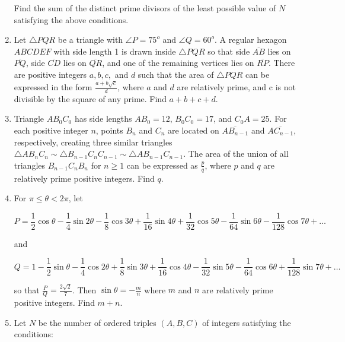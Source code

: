 \documentclass{article}
\begin{document}
\begin{enumerate}[label=\arabic*., itemsep=0.5em]
Find the sum of the distinct prime divisors of the least possible value of $N$ satisfying the above conditions.\par \vspace{0.5em}\item Let $\bigtriangleup PQR$ be a triangle with $\angle P = 75^o$ and $\angle Q = 60^o$. A regular hexagon $ABCDEF$ with side length 1 is drawn inside $\triangle PQR$ so that side $\overline{AB}$ lies on $\overline{PQ}$, side $\overline{CD}$ lies on $\overline{QR}$, and one of the remaining vertices lies on $\overline{RP}$. There are positive integers $a, b, c, $ and $d$ such that the area of $\triangle PQR$ can be expressed in the form $\frac{a+b\sqrt{c}}{d}$, where $a$ and $d$ are relatively prime, and c is not divisible by the square of any prime. Find $a+b+c+d$.\par \vspace{0.5em}\item Triangle $AB_0C_0$ has side lengths $AB_0 = 12$, $B_0C_0 = 17$, and $C_0A = 25$. For each positive integer $n$, points $B_n$ and $C_n$ are located on $\overline{AB_{n-1}}$ and $\overline{AC_{n-1}}$, respectively, creating three similar triangles $\triangle AB_nC_n \sim \triangle B_{n-1}C_nC_{n-1} \sim \triangle AB_{n-1}C_{n-1}$. The area of the union of all triangles $B_{n-1}C_nB_n$ for $n\geq1$ can be expressed as $\tfrac pq$, where $p$ and $q$ are relatively prime positive integers. Find $q$.\par \vspace{0.5em}\item For $\pi \le \theta < 2\pi$, let


\begin{equation*}
P=\dfrac12\cos\theta-\dfrac14\sin2\theta-\dfrac18\cos3\theta+\dfrac1{16}\sin4\theta+\dfrac1{32}\cos5\theta-\dfrac1{64}\sin6\theta-\dfrac1{128}\cos7\theta+\ldots
\end{equation*}


and


\begin{equation*}
Q=1-\dfrac12\sin\theta-\dfrac14\cos2\theta+\dfrac1{8}\sin3\theta+\dfrac1{16}\cos4\theta-\dfrac1{32}\sin5\theta-\dfrac1{64}\cos6\theta+\dfrac1{128}\sin7\theta
+\ldots
\end{equation*}


so that $\frac{P}{Q} = \frac{2\sqrt2}{7}$. Then $\sin\theta = -\frac{m}{n}$ where $m$ and $n$ are relatively prime positive integers. Find $m+n$.\par \vspace{0.5em}\item Let $N$ be the number of ordered triples $(A,B,C)$ of integers satisfying the conditions: 


\end{enumerate}
\end{document}
